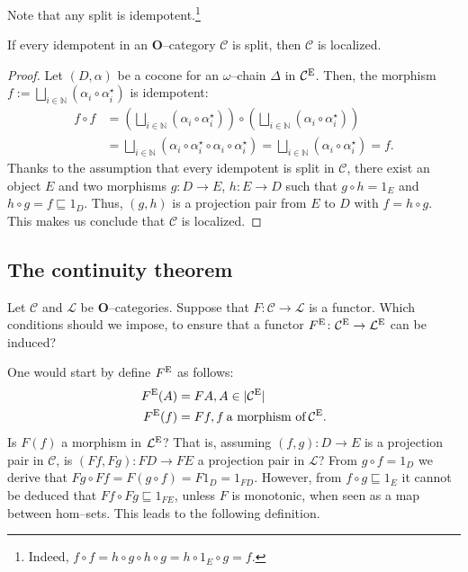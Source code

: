 Note that any split is idempotent.\footnote{Indeed, \(f \circ f = h \circ g \circ h \circ g = h \circ 1_E \circ g = f\).}

\begin{prp}
  If every idempotent in an \(\mathbf{O}\)--category \(\mathcal{C}\) is split, then \(\mathcal{C}\) is localized.
\end{prp}
\begin{proof}
  Let \((D,\alpha)\) be a cocone for an \(\omega{}\)--chain \(\Delta{}\) in \(\mathcal{C}^\textup{E}\).
  Then, the morphism \(f := \bigsqcup_{i \in \mathbb{N}}(\alpha_i \circ \alpha_i^\star)\) is idempotent:
  \begin{equation*}
    \begin{split}
      f \circ f &= (\bigsqcup_{i \in \mathbb{N}}(\alpha_i \circ \alpha_i^\star)) \circ (\bigsqcup_{i \in \mathbb{N}}(\alpha_i \circ \alpha_i^\star)) \\
      &= \bigsqcup_{i \in \mathbb{N}}(\alpha_i \circ \alpha_i^\star \circ \alpha_i \circ \alpha_i^\star)
      = \bigsqcup_{i \in \mathbb{N}}(\alpha_i \circ \alpha_i^\star) = f.
    \end{split}
  \end{equation*}
  Thanks to the assumption that every idempotent is split in \(\mathcal{C}\), there exist an object \(E\) and two morphisms \(g \colon D \to E\), \(h \colon E \to D\) such that \(g \circ h = 1_E\) and \(h \circ g = f \sqsubseteq 1_D\).
  Thus, \((g,h)\) is a projection pair from \(E\) to \(D\) with \(f = h \circ g\).
  This makes us conclude that \(\mathcal{C}\) is localized.
\end{proof}

\subsection{The continuity theorem}

Let \(\mathcal{C}\) and \(\mathcal{L}\) be \(\mathbf{O}\)--categories. Suppose that \(F \colon \mathcal{C} \to \mathcal{L}\) is a functor.
Which conditions should we impose, to ensure that a functor \(F^\textup{E} \colon \mathcal{C}^\textup{E} \to \mathcal{L}^\textup{E}\) can be induced?

One would start by define \(F^\textup{E}\) as follows:
\begin{align*}
  F^\textup{E}(A) &= FA, A \in \lvert \mathcal{C}^\textup{E} \rvert \\
  F^\textup{E}(f) &= Ff, f\:\text{a morphism of}\:\mathcal{C}^\textup{E}.
\end{align*}
Is \(F(f)\) a morphism in \(\mathcal{L}^\textup{E}\)?
That is, assuming \((f,g) \colon D \to E\) is a projection pair in \(\mathcal{C}\), is \((Ff,Fg) \colon FD \to FE\) a projection pair in \(\mathcal{L}\)?
From \(g \circ f = 1_D\) we derive that \(Fg \circ Ff = F(g \circ f) = F1_D = 1_{FD}\).
However, from \(f \circ g \sqsubseteq 1_E\) it cannot be deduced that \(Ff \circ Fg \sqsubseteq 1_{FE}\), unless \(F\) is monotonic, when seen as a map between hom--sets. This leads to the following definition.

